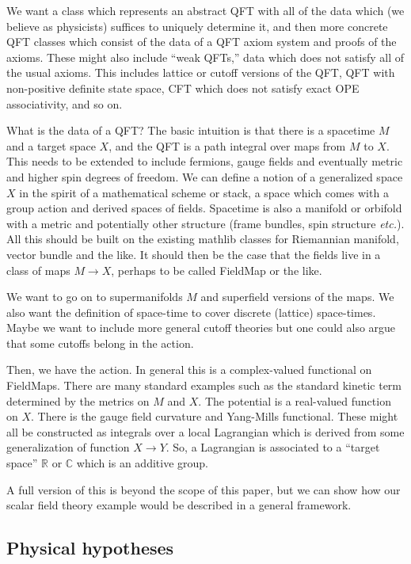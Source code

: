 \documentclass{article}
\def\IC{\mathbb{C}}
\def\IR{\mathbb{R}}
\begin{document}
We want a class which represents an abstract QFT with all of the data which (we believe as physicists) suffices to uniquely determine it,
and then more concrete QFT classes which consist of the data of a QFT axiom system and proofs of the axioms.  These might also include ``weak QFTs,''
data which does not satisfy all of the usual axioms.  This includes lattice or cutoff versions of the QFT, QFT with non-positive definite state space,
CFT which does not satisfy exact OPE associativity, and so on.

What is the data of a QFT?  The basic intuition is that there is a spacetime $M$ and a target space $X$, and the QFT is a path integral
over maps from $M$ to $X$.  This needs to be extended to include fermions, gauge fields and eventually metric and higher spin degrees of freedom.
We can define a notion of a generalized space $X$ in the spirit of a mathematical scheme or stack, a space which comes with a group action
and derived spaces of fields.  Spacetime is also a manifold or orbifold with a metric and potentially other structure (frame bundles, spin structure {\it etc.}).
All this should be built on the existing mathlib classes for Riemannian manifold, vector bundle and the like.
It should then be the case that the fields live in a class of maps $M\rightarrow X$, perhaps to be called FieldMap or the like.

We want to go on to supermanifolds $M$ and superfield versions of the maps.  We also want the definition of space-time to cover
discrete (lattice) space-times.  Maybe we want to include more general cutoff theories but one could also argue that some cutoffs belong in the action.

Then, we have the action.  In general this is a complex-valued functional on FieldMaps.  There are many standard examples such as the
standard kinetic term determined by the metrics on $M$ and $X$.  The potential is a real-valued function on $X$.  There is the gauge field curvature
and Yang-Mills functional.  These might all be constructed as integrals over a local Lagrangian which is derived from some generalization of function $X\rightarrow Y$.
So, a Lagrangian is associated to a ``target space'' $\IR$ or $\IC$ which is an additive group.

A full version of this is beyond the scope of this paper, but we can show how our scalar field theory example would be described in a general framework.

\subsection{Physical hypotheses}
\end{document}
